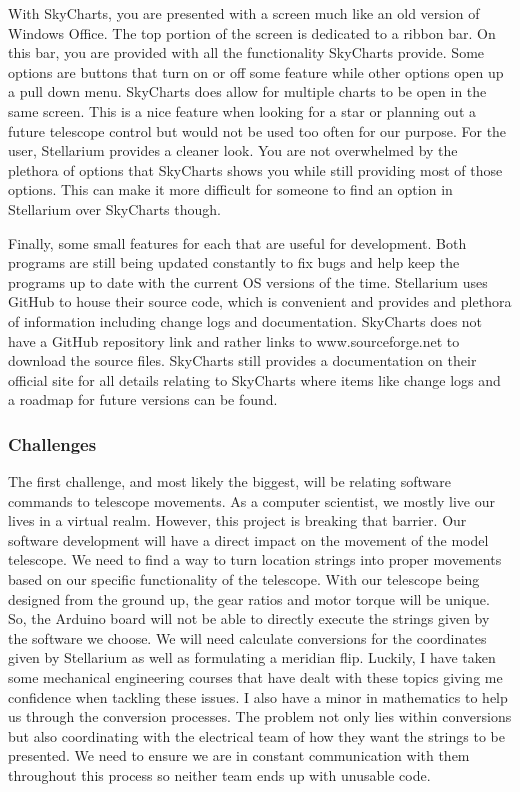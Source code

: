 \documentclass[12pt]{article}
\begin{document}
With SkyCharts, you are presented with a screen much like an old version of Windows Office. The top portion of the screen is dedicated to a ribbon bar. On this bar, you are provided with all the functionality SkyCharts provide. Some options are buttons that turn on or off some feature while other options open up a pull down menu. SkyCharts does allow for multiple charts to be open in the same screen. This is a nice feature when looking for a star or planning out a future telescope control but would not be used too often for our purpose. For the user, Stellarium provides a cleaner look. You are not overwhelmed by the plethora of options that SkyCharts shows you while still providing most of those options. This can make it more difficult for someone to find an option in Stellarium over SkyCharts though.

Finally, some small features for each that are useful for development. Both programs are still being updated constantly to fix bugs and help keep the programs up to date with the current OS versions of the time. Stellarium uses GitHub to house their source code, which is convenient and provides and plethora of information including change logs and documentation. SkyCharts does not have a GitHub repository link and rather links to www.sourceforge.net to download the source files. SkyCharts still provides a documentation on their official site for all details relating to SkyCharts where items like change logs and a roadmap for future versions can be found.

\subsubsection{Challenges}

The first challenge, and most likely the biggest, will be relating software commands to telescope movements. As a computer scientist, we mostly live our lives in a virtual realm. However, this project is breaking that barrier. Our software development will have a direct impact on the movement of the model telescope. We need to find a way to turn location strings into proper movements based on our specific functionality of the telescope. With our telescope being designed from the ground up, the gear ratios and motor torque will be unique. So, the Arduino board will not be able to directly execute the strings given by the software we choose. We will need calculate conversions for the coordinates given by Stellarium as well as formulating a meridian flip. Luckily, I have taken some mechanical engineering courses that have dealt with these topics giving me confidence when tackling these issues. I also have a minor in mathematics to help us through the conversion processes. The problem not only lies within conversions but also coordinating with the electrical team of how they want the strings to be presented. We need to ensure we are in constant communication with them throughout this process so neither team ends up with unusable code.
\end{document}
